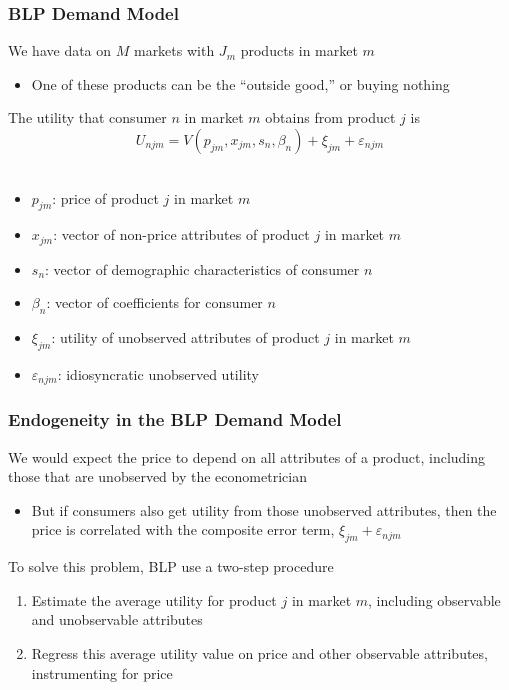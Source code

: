 \documentclass{beamer}
\begin{document}
\begin{frame}\frametitle{BLP Demand Model}
    We have data on $M$ markets with $J_m$ products in market $m$
    \begin{itemize}
        \item One of these products can be the ``outside good,'' or buying nothing
    \end{itemize}
    \vspace{2ex}
    The utility that consumer $n$ in market $m$ obtains from product $j$ is
    $$U_{njm} = V(p_{jm}, x_{jm}, s_n, \beta_n) + \xi_{jm} + \varepsilon_{njm}$$ \\
    \vspace{-1ex}
    \begin{itemize}
        \item $p_{jm}$: price of product $j$ in market $m$
        \item $x_{jm}$: vector of non-price attributes of product $j$ in market $m$
        \item $s_n$: vector of demographic characteristics of consumer $n$
        \item $\beta_n$: vector of coefficients for consumer $n$
        \item $\xi_{jm}$: utility of unobserved attributes of product $j$ in market $m$
        \item $\varepsilon_{njm}$: idiosyncratic unobserved utility
    \end{itemize}
\end{frame}

\begin{frame}\frametitle{Endogeneity in the BLP Demand Model}
    We would expect the price to depend on all attributes of a product, including those that are unobserved by the econometrician
    \begin{itemize}
        \item But if consumers also get utility from those unobserved attributes, then the price is correlated with the composite error term, $\xi_{jm} + \varepsilon_{njm}$
    \end{itemize}
    \vspace{2ex}
    To solve this problem, BLP use a two-step procedure
    \begin{enumerate}
        \item Estimate the average utility for product $j$ in market $m$, including observable and unobservable attributes
        \item Regress this average utility value on price and other observable attributes, instrumenting for price 
    \end{enumerate}
\end{frame}
\end{document}

